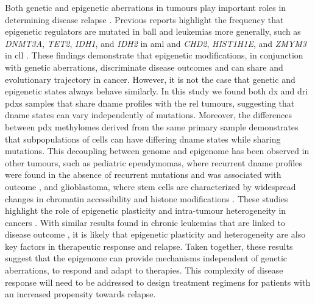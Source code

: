 Both genetic and epigenetic aberrations in tumours play important roles in determining disease relapse \cite{nordlundGenomewideSignaturesDifferential2013,leeEpigeneticRemodelingBcell2015}.
Previous reports highlight the frequency that epigenetic regulators are mutated in \gls{ball} \cite{maRiseFallSubclones2015} and leukemias more generally, such as \emph{DNMT3A}, \emph{TET2}, \emph{IDH1}, and \emph{IDH2} in \gls{aml} \cite{kishtagariDriverMutationsAcute2020,papaemmanuilGenomicClassificationPrognosis2016,leyDNMT3AMutationsAcute2010} and \emph{CHD2}, \emph{HIST1H1E}, and \emph{ZMYM3} in \gls{cll} \cite{billotDeregulationAiolosExpression2011,landauChronicLymphocyticLeukemia2013,landauEvolutionImpactSubclonal2013}.
These findings demonstrate that epigenetic modifications, in conjunction with genetic aberrations, discriminate disease outcomes and can share and evolutionary trajectory in cancer.
However, it is not the case that genetic and epigenetic states always behave similarly.
In this study we found both \gls{dx} and \gls{dri} \glspl{pdx} samples that share \gls{dname} profiles with the \gls{rel} tumours, suggesting that \gls{dname} states can vary independently of mutations.
Moreover, the differences between \gls{pdx} methylomes derived from the same primary sample demonstrates that subpopulations of cells can have differing \gls{dname} states while sharing mutations.
This decoupling between genome and epigenome has been observed in other tumours, such as pediatric ependymomas, where recurrent \gls{dname} profiles were found in the absence of recurrent mutations and was associated with outcome \cite{mackEpigenomicAlterationsDefine2014,pajtlerMolecularClassificationEpendymal2015}, and glioblastoma, where stem cells are characterized by widespread changes in chromatin accessibility \cite{guilhamonSinglecellChromatinAccessibility2021} and histone modifications \cite{liauAdaptiveChromatinRemodeling2017}.
These studies highlight the role of epigenetic plasticity and intra-tumour heterogeneity in cancers \cite{flavahanEpigeneticPlasticityHallmarks2017}.
With similar results found in chronic leukemias that are linked to disease outcome \cite{pastoreCorruptedCoordinationEpigenetic2019,landauLocallyDisorderedMethylation2014,gaitiEpigeneticEvolutionLineage2019,namIntegratingGeneticNongenetic2021}, it is likely that epigenetic plasticity and heterogeneity are also key factors in therapeutic response and relapse.
Taken together, these results suggest that the epigenome can provide mechanisms independent of genetic aberrations, to respond and adapt to therapies.
This complexity of disease response will need to be addressed to design treatment regimens for patients with an increased propensity towards relapse.

